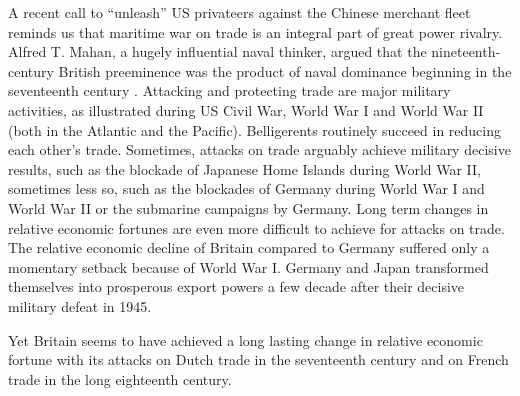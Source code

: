 \documentclass[12pt,a4paper,notitlepage,english]{article}
\begin{document}
A recent call to ``unleash'' US privateers against the Chinese merchant fleet \citep{Cancian2020} reminds us that maritime war on trade is an integral part of great power rivalry.
Alfred T. Mahan, a hugely influential naval thinker, argued that the nineteenth-century British preeminence was the product of naval dominance beginning in the seventeenth century \citep{Mahan2004,Mahan2016,Mahan2016a}.
Attacking and protecting trade are major military activities, as illustrated during US Civil War, World War I and World War II (both in the Atlantic and the Pacific).
Belligerents routinely succeed in reducing each other's trade.
Sometimes, attacks on trade arguably achieve military decisive results, such as the blockade of Japanese Home Islands during World War II, sometimes less so, such as the blockades of Germany during World War I and World War II or the submarine campaigns by Germany.
Long term changes in relative economic fortunes are even more difficult to achieve for attacks on trade.
The relative economic decline of Britain compared to Germany suffered only a momentary setback because of World War I.
Germany and Japan transformed themselves into prosperous export powers a few decade after their decisive military defeat in 1945.

Yet Britain seems to have achieved a long lasting change in relative economic fortune with its attacks on Dutch trade in the seventeenth century and on French trade in the long eighteenth century.
\end{document}
